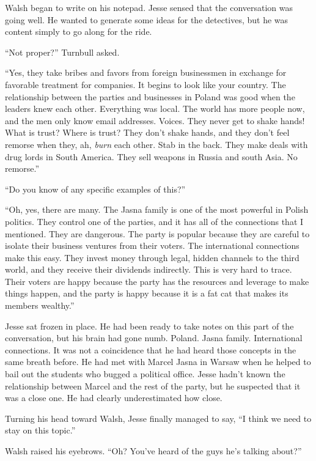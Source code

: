\documentclass[12pt]{book}
\begin{document}
Walsh began to write on his notepad.  Jesse sensed that the conversation was going well.  He wanted to generate some ideas for the detectives, but he was content simply to go along for the ride.

``Not proper?'' Turnbull asked.

``Yes, they take bribes and favors from foreign businessmen in exchange for favorable treatment for companies.  It begins to look like your country.  The relationship between the parties and businesses in Poland was good when the leaders knew each other.  Everything was local.  The world has more people now, and the men only know email addresses.  Voices.  They never get to shake hands!  What is trust?  Where is trust?  They don't shake hands, and they don't feel remorse when they, ah, \emph{burn} each other.  Stab in the back.  They make deals with drug lords in South America.  They sell weapons in Russia and south Asia.  No remorse.''

``Do you know of any specific examples of this?''

``Oh, yes, there are many.  The Jasna family is one of the most powerful in Polish politics.  They control one of the parties, and it has all of the connections that I mentioned.  They are dangerous.  The party is popular because they are careful to isolate their business ventures from their voters.  The international connections make this easy.  They invest money through legal, hidden channels to the third world, and they receive their dividends indirectly.  This is very hard to trace.  Their voters are happy because the party has the resources and leverage to make things happen, and the party is happy because it is a fat cat that makes its members wealthy.''

Jesse sat frozen in place.  He had been ready to take notes on this part of the conversation, but his brain had gone numb.  Poland.  Jasna family.  International connections.  It was not a coincidence that he had heard those concepts in the same breath before.  He had met with Marcel Jasna in Warsaw when he helped to bail out the students who bugged a political office.  Jesse hadn't known the relationship between Marcel and the rest of the party, but he suspected that it was a close one.  He had clearly underestimated how close.

Turning his head toward Walsh, Jesse finally managed to say, ``I think we need to stay on this topic.''

Walsh raised his eyebrows.  ``Oh?  You've heard of the guys he's talking about?''
\end{document}
